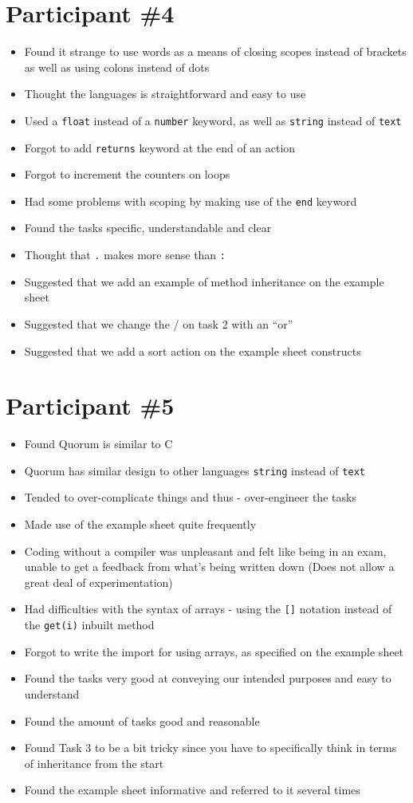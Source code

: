 \section{Participant {\#}4}
\begin{itemize}
\item Found it strange to use words as a means of closing scopes instead of brackets as well as using colons instead of dots
\item Thought the languages is straightforward and easy to use
\item Used a \lstinline!float! instead of a \lstinline!number! keyword, as well as \lstinline!string! instead of \lstinline!text!
\item Forgot to add \lstinline!returns! keyword at the end of an action
\item Forgot to increment the counters on loops
\item Had some problems with scoping by making use of the \lstinline!end! keyword
\item Found the tasks specific, understandable and clear
\item Thought that \lstinline!.! makes more sense than \lstinline!:!
\item Suggested that we add an example of method inheritance on the example sheet
\item Suggested that we change the / on task 2 with an “or”
\item Suggested that we add a sort action on the example sheet
 constructs
\end{itemize}
\section{Participant {\#}5}
\begin{itemize}
\item Found Quorum is similar to C
\item Quorum has similar design to other languages \lstinline!string! instead of \lstinline!text!
\item Tended to over-complicate things and thus - over-engineer the tasks
\item Made use of the example sheet quite frequently
\item Coding without a compiler was unpleasant and felt like being in an exam, unable to get a feedback from what’s being written down (Does not allow a great deal of experimentation)
\item Had difficulties with the syntax of arrays - using the \lstinline![]! notation instead of the \lstinline!get(i)! inbuilt method
\item Forgot to write the import for using arrays, as specified on the example sheet
\item Found the tasks very good at conveying our intended purposes and easy to understand
\item Found the amount of tasks good and reasonable
\item Found Task 3 to be a bit tricky since you have to specifically think in terms of inheritance from the start
\item Found the example sheet informative and referred to it several times
\end{itemize}
